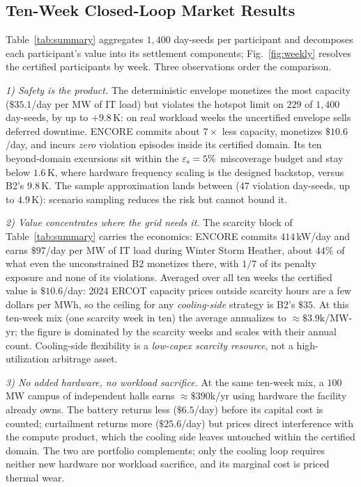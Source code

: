 \vspace{-3mm}
\subsection{Ten-Week Closed-Loop Market Results}
\label{subsec:market}

Table~\ref{tab:summary} aggregates $1{,}400$ day-seeds per participant and
decomposes each participant's value into its settlement components;
Fig.~\ref{fig:weekly} resolves the certified participants by week. Three
observations order the comparison.

\emph{1) Safety is the product.} The deterministic envelope monetizes the
most capacity ($\$35.1$/day per MW of IT load) but violates the hotspot limit
on $229$ of $1{,}400$ day-seeds, by up to $+9.8$\,K: on real workload weeks
the uncertified envelope sells deferred downtime.
ENCORE commits about $7\times$ less capacity, monetizes $\$10.6$/day, and incurs
\emph{zero} violation episodes inside its certified domain. Its ten
beyond-domain excursions sit within the $\varepsilon_{\mathrm{s}}=5\%$ miscoverage budget and
stay below $1.6$\,K, where hardware
frequency scaling is the designed backstop, versus B2's $9.8$\,K. The sample
approximation lands between ($47$ violation day-seeds, up to $4.9$\,K):
scenario sampling reduces the risk but cannot bound it.

\emph{2) Value concentrates where the grid needs it.} The scarcity block of
Table~\ref{tab:summary} carries the economics: ENCORE commits
$414$\,kW/day and earns $\$97$/day per MW of IT load during Winter Storm
Heather, about $44\%$ of what even the unconstrained B2 monetizes there,
with $1{/}7$ of its penalty exposure and none of its violations. Averaged
over all ten weeks the certified value is $\$10.6$/day: 2024 ERCOT capacity
prices outside scarcity hours are a few dollars per MWh, so the ceiling for
any \emph{cooling-side} strategy is B2's $\$35$. At this ten-week mix (one
scarcity week in ten) the average annualizes to ${\approx}\$3.9$k/MW-yr;
the figure is dominated by the scarcity weeks and scales with their annual
count. Cooling-side flexibility is a \emph{low-capex scarcity resource}, not a
high-utilization arbitrage asset.

\emph{3) No added hardware, no workload sacrifice.} At the same ten-week
mix, a $100$\,MW campus of independent halls earns ${\approx}\$390$k/yr
using hardware the facility already owns. The battery returns less
($\$6.5$/day) before its capital cost is counted; curtailment returns more
($\$25.6$/day) but prices direct interference with the compute product,
which the cooling side leaves untouched within the certified domain. The two
are portfolio complements; only the cooling loop requires neither new
hardware nor workload sacrifice, and its marginal cost is priced thermal
wear.

